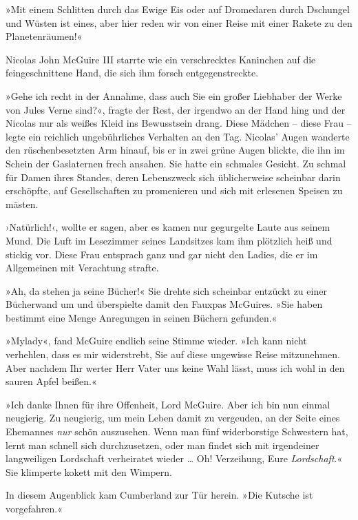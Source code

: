»Mit einem Schlitten durch das Ewige Eis oder auf Dromedaren durch
Dschungel und Wüsten ist eines, aber hier reden wir von einer Reise
mit einer Rakete zu den Planetenräumen!«

\tb

Nicolas John McGuire III starrte wie ein verschrecktes Kaninchen
auf die feingeschnittene Hand, die sich ihm forsch
entgegenstreckte.

»Gehe ich recht in der Annahme, dass auch Sie ein großer Liebhaber
der Werke von Jules Verne sind?«, fragte der Rest, der irgendwo an
der Hand hing und der Nicolas nur als weißes Kleid ins Bewusstsein
drang. Diese Mädchen – diese Frau – legte ein reichlich
ungebührliches Verhalten an den Tag. Nicolas’ Augen wanderte den
rüschenbesetzten Arm hinauf, bis er in zwei grüne Augen blickte,
die ihn im Schein der Gaslaternen frech ansahen. Sie hatte ein
schmales Gesicht. Zu schmal für Damen ihres Standes, deren
Lebenszweck sich üblicherweise scheinbar darin erschöpfte, auf
Gesellschaften zu promenieren und sich mit erlesenen Speisen zu
mästen.

›Natürlich!‹, wollte er sagen, aber es kamen nur gegurgelte Laute
aus seinem Mund. Die Luft im Lesezimmer seines Landsitzes kam ihm
plötzlich heiß und stickig vor. Diese Frau entsprach ganz und gar
nicht den Ladies, die er im Allgemeinen mit Verachtung strafte.

»Ah, da stehen ja seine Bücher!« Sie drehte sich scheinbar entzückt
zu einer Bücherwand um und überspielte damit den Fauxpas McGuires.
»Sie haben bestimmt eine Menge Anregungen in seinen Büchern
gefunden.«

»Mylady«, fand McGuire endlich seine Stimme wieder. »Ich kann nicht
verhehlen, dass es mir widerstrebt, Sie auf diese ungewisse Reise
mitzunehmen. Aber nachdem Ihr werter Herr Vater uns keine Wahl
lässt, muss ich wohl in den sauren Apfel beißen.«

»Ich danke Ihnen für ihre Offenheit, Lord McGuire. Aber ich bin nun
einmal neugierig. Zu neugierig, um mein Leben damit zu vergeuden,
an der Seite eines Ehemannes \emph{nur} schön auszusehen. Wenn man
fünf widerborstige Schwestern hat, lernt man schnell sich
durchzusetzen, oder man findet sich mit irgendeiner langweiligen
Lordschaft verheiratet wieder … Oh! Verzeihung, Eure
\emph{Lordschaft}.« Sie klimperte kokett mit den Wimpern.

\bigpar

In diesem Augenblick kam Cumberland zur Tür herein. »Die Kutsche
ist vorgefahren.«

